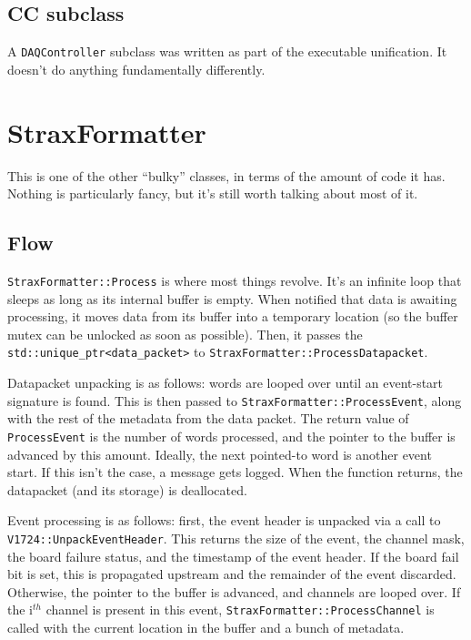 \subsection{CC subclass}

A \texttt{DAQController} subclass was written as part of the executable unification.
It doesn't do anything fundamentally differently.

\section{StraxFormatter}

This is one of the other ``bulky'' classes, in terms of the amount of code it has.
Nothing is particularly fancy, but it's still worth talking about most of it.

\subsection{Flow}

\texttt{StraxFormatter::Process} is where most things revolve.
It's an infinite loop that sleeps as long as its internal buffer is empty.
When notified that data is awaiting processing, it moves data from its buffer into a temporary location (so the buffer mutex can be unlocked as soon as possible).
Then, it passes the \texttt{std::unique\_ptr<data\_packet>} to \texttt{StraxFormatter::ProcessDatapacket}.

Datapacket unpacking is as follows: words are looped over until an event-start signature is found.
This is then passed to \texttt{StraxFormatter::ProcessEvent}, along with the rest of the metadata from the data packet.
The return value of \texttt{ProcessEvent} is the number of words processed, and the pointer to the buffer is advanced by this amount.
Ideally, the next pointed-to word is another event start.
If this isn't the case, a message gets logged.
When the function returns, the datapacket (and its storage) is deallocated.

Event processing is as follows: first, the event header is unpacked via a call to \texttt{V1724::UnpackEventHeader}.
This returns the size of the event, the channel mask, the board failure status, and the timestamp of the event header.
If the board fail bit is set, this is propagated upstream and the remainder of the event discarded.
Otherwise, the pointer to the buffer is advanced, and channels are looped over.
If the i$^{th}$ channel is present in this event, \texttt{StraxFormatter::ProcessChannel} is called with the current location in the buffer and a bunch of metadata.

